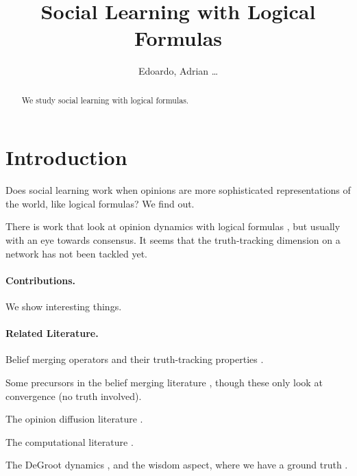 \documentclass{scrartcl}
\title{
    Social Learning with Logical Formulas
    }
\author{Edoardo, Adrian \dots}
\date{}
\theoremstyle{definition}
\begin{document}
\maketitle

\begin{abstract}
    \noindent
    We study social learning with logical formulas.
\end{abstract}

\section{Introduction}\label{sec:introduction}
Does social learning work when opinions are more sophisticated representations of the world,
like logical formulas? We find out.

There is work that look at opinion dynamics with logical formulas
\citep{Schwind2015BeliefRevisiona,Schwind2016PromotingBeliefs,Christoff2017StabilityBinary,Botan2019MultiIssueOpinion,Schwind2024BeliefFlowFramework,Schwind2026CharacterizingConsensuses},
but usually with an eye towards consensus.
It seems that the truth-tracking dimension on a network has not been tackled yet.



\paragraph{Contributions.}
We show interesting things.

\paragraph{Related Literature.}
Belief merging operators \citep{Konieczny2011LogicBased} and their truth-tracking properties \citep{Everaere2010EpistemicView,Everaere2020BeliefMerging}.

Some precursors in the belief merging literature 
\citep{Schwind2015BeliefRevisiona,Schwind2016PromotingBeliefs,Schwind2024BeliefFlowFramework,Schwind2026CharacterizingConsensuses},
though these only look at convergence (no truth involved).

The opinion diffusion literature \citep{Grandi2015PropositionalOpinion,Christoff2017StabilityBinary,Botan2019MultiIssueOpinion,Grandi2021GamesInfluence}.

The computational literature \citep{Betz2013DebateDynamics}.

The DeGroot dynamics \citep{DeGroot1974ReachingConsensus}, and the wisdom aspect, where we have a ground truth \citep{Golub2010NaiveLearning}.
\end{document}
